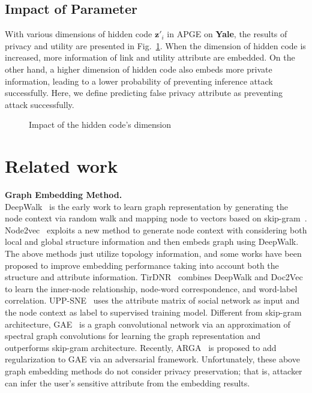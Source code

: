 \documentclass{article}
\begin{document}
\subsection{Impact of Parameter}
With various dimensions of hidden code $\mathbf{z}'_i$ in APGE on \textbf{Yale}, the results of privacy and utility are presented in Fig.~\ref{fig:Impact}. When the dimension of hidden code is increased, more information of link and utility attribute are embedded. On the other hand, a higher dimension of hidden code also embeds more private information, leading to a lower probability of preventing inference attack successfully. Here, we define predicting false privacy attribute as preventing attack successfully.
%
\begin{figure}[!ht]
     \hfill
     \caption{Impact of the hidden code's dimension }
     \label{fig:Impact}
   \end{figure}




\section{Related work}

\textbf{Graph Embedding Method.}\\
DeepWalk~\citep{perozzi2014deepwalk} is the early work to learn graph representation by generating the node context via random walk and mapping node to vectors based on skip-gram~\citep{mikolov2013efficient}.
Node2vec~\citep{grover2016node2vec} exploits a new method to generate node context with considering both local and global structure information and then embeds graph using DeepWalk.
The above methods just utilize topology information, and some works have been proposed to improve embedding performance taking into account both the structure and attribute information.
TirDNR~\citep{pan2016tri} combines DeepWalk and Doc2Vec~\citep{dai2015document} to learn the inner-node relationship, node-word correspondence, and word-label correlation.
UPP-SNE~\citep{zhang2017user} uses the attribute matrix of social network as input and the node context as label to supervised training model.
Different from skip-gram architecture, GAE~\citep{kipf2016variational} is a graph convolutional network via an approximation of spectral graph convolutions for learning the graph representation and outperforms skip-gram architecture.
Recently, ARGA~\citep{pan2018adversarially} is proposed to add regularization to GAE via an adversarial framework.
Unfortunately, these above graph embedding methods do not consider privacy preservation; that is, attacker can infer the user's sensitive attribute from the embedding results.
\end{document}
